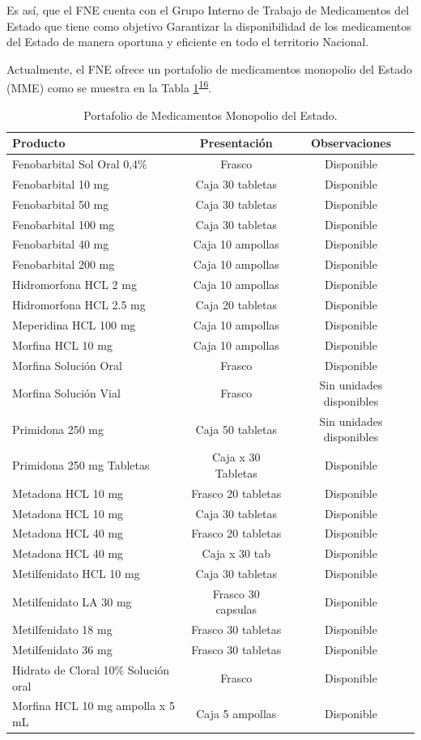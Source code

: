 \documentclass[
]{book}
\begin{document}
Es así, que el FNE cuenta con el Grupo Interno de Trabajo de Medicamentos del Estado que tiene como objetivo Garantizar la disponibilidad de los medicamentos del Estado de manera oportuna y eficiente en todo el territorio Nacional.

Actualmente, el FNE ofrece un portafolio de medicamentos monopolio del Estado (MME) como se muestra en la Tabla \ref{tab:portafolioMME}\textsuperscript{\protect\hyperlink{ref-ColombiaCompraEficiente2021}{16}}.

\begin{table}[!h]

\caption{\label{tab:portafolioMME}Portafolio de Medicamentos Monopolio del Estado.}
\centering
\begin{tabular}[t!]{lcc}
\toprule
Producto & Presentación & Observaciones\\
\midrule
Fenobarbital Sol Oral 0,4\% & Frasco & Disponible\\
Fenobarbital 10 mg & Caja 30 tabletas & Disponible\\
Fenobarbital 50 mg & Caja 30 tabletas & Disponible\\
Fenobarbital 100 mg & Caja 30 tabletas & Disponible\\
Fenobarbital 40 mg & Caja 10 ampollas & Disponible\\
\addlinespace
Fenobarbital 200 mg & Caja 10 ampollas & Disponible\\
Hidromorfona HCL 2 mg & Caja 10 ampollas & Disponible\\
Hidromorfona HCL 2.5 mg & Caja 20 tabletas & Disponible\\
Meperidina HCL 100 mg & Caja 10 ampollas & Disponible\\
Morfina HCL 10 mg & Caja 10 ampollas & Disponible\\
\addlinespace
Morfina Solución Oral & Frasco & Disponible\\
Morfina Solución Vial & Frasco & Sin unidades disponibles\\
Primidona 250 mg & Caja 50 tabletas & Sin unidades disponibles\\
Primidona 250 mg Tabletas & Caja x 30 Tabletas & Disponible\\
Metadona HCL 10 mg & Frasco 20 tabletas & Disponible\\
\addlinespace
Metadona HCL 10 mg & Caja 30 tabletas & Disponible\\
Metadona HCL 40 mg & Frasco 20 tabletas & Disponible\\
Metadona HCL 40 mg & Caja x 30 tab & Disponible\\
Metilfenidato HCL 10 mg & Caja 30 tabletas & Disponible\\
Metilfenidato LA 30 mg & Frasco 30 capsulas & Disponible\\
\addlinespace
Metilfenidato 18 mg & Frasco 30 tabletas & Disponible\\
Metilfenidato 36 mg & Frasco 30 tabletas & Disponible\\
Hidrato de Cloral 10\% Solución oral & Frasco & Disponible\\
Morfina HCL 10 mg ampolla x 5 mL & Caja 5 ampollas & Disponible\\
\bottomrule
\end{tabular}
\end{table}
\end{document}
